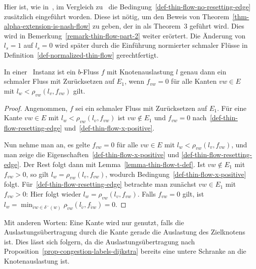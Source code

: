 \begin{remark}\label{remark-thin-flow}
	Hier ist, wie in~\cite[Definition~4]{Cominetti2011}, im Vergleich zu~\cite[Definition~6]{Koch2011} die Bedingung~\ref{def-thin-flow-no-resetting-edge} zusätzlich eingeführt worden.
	Diese ist nötig, um den Beweis von Theorem~\ref{thm-alpha-extension-is-nash-flow} zu geben, der in \cite{Koch2011} als Theorem~3 geführt wird.
	Dies wird in Bemerkung~\ref{remark-thin-flow-part-2} weiter erörtert.
	Die Änderung von $l_s=1$ auf $l_s=0$ wird später durch die Einführung normierter schmaler Flüsse in Definition~\ref{def-normalized-thin-flow} gerechtfertigt.
\end{remark}

\begin{lemma}\label{lemma-equivalent-thin-flow}
	In einer \problemThinFlow\ Instanz ist ein $b$-Fluss $f$ mit Knotenauslastung $l$ genau dann ein schmaler Fluss mit Zurück\-setzen auf $E_1$, wenn $f_{vw}= 0$ für alle Kanten $vw\in E$ mit $l_w < \rho_{vw}(l_v, f_{vw})$ gilt.
\end{lemma}
\begin{proof}
	Angenommen, $f$ sei ein schmaler Fluss mit Zurücksetzen auf $E_1$.
	Für eine Kante $vw\in E$ mit $l_w < \rho_{vw}(l_v, f_{vw})$ ist $vw\notin E_1$ und $f_{vw}=0$ nach~\ref{def-thin-flow-resetting-edge} und~\ref{def-thin-flow-x-positive}.

	Nun nehme man an, es gelte $f_{vw}=0$ für alle $vw\in E$ mit $l_w < \rho_{vw}(l_v, f_{vw})$, und man zeige die Eigenschaften~\ref{def-thin-flow-x-positive} und \ref{def-thin-flow-resetting-edge}.
	Der Rest folgt dann mit Lemma~\ref{lemma-thin-flow-t-def}.
	Ist $vw\notin E_1$ mit $f_{vw}>0$, so gilt $l_w = \rho_{vw}(l_v, f_{vw})$, wodurch Bedingung~\ref{def-thin-flow-x-positive} folgt.
	Für~\ref{def-thin-flow-resetting-edge} betrachte man zunächst $vw\in E_1$ mit $f_{vw}>0$: Hier folgt wieder $l_w = \rho_{vw}(l_v, f_{vw})$.
	Falls $f_{vw}=0$ gilt, ist $l_w=\min_{\tilde{v}w\in \delta^-(w)} \rho_{\tilde{v}w}(l_{\tilde{v}}, f_{\tilde{v}w}) = 0$.
\end{proof}

Mit anderen Worten: Eine Kante wird nur genutzt, falls die Auslastungs\-über\-tra\-gung durch die Kante gerade die Auslastung des Zielknotens ist.
Dies lässt sich folgern, da die Auslastungsübertragung nach Proposition~\ref{prop-congestion-labels-dijkstra} bereits eine untere Schranke an die Knotenauslastung ist.

